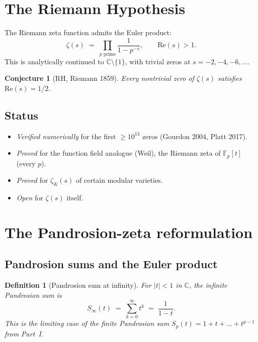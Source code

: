\documentclass[11pt,a4paper]{article}
\newtheorem{conjecture}[theorem]{Conjecture}
\newtheorem{definition}[theorem]{Definition}
\begin{document}
\tableofcontents

\section{The Riemann Hypothesis}\label{sec:setup}

The Riemann zeta function admits the Euler product:
\begin{equation}\label{eq:euler}
\zeta(s) \;=\; \prod_{p \text{ prime}} \frac{1}{1 - p^{-s}}, \qquad \mathrm{Re}(s) > 1.
\end{equation}
This is analytically continued to $\mathbb C \setminus \{1\}$, with trivial zeros at $s = -2, -4, -6, \dots$.

\begin{conjecture}[RH, Riemann 1859]\label{conj:rh}
Every nontrivial zero of $\zeta(s)$ satisfies $\mathrm{Re}(s) = 1/2$.
\end{conjecture}

\subsection{Status}
\begin{itemize}
\item \emph{Verified numerically} for the first $\ge 10^{13}$ zeros (Gourdon 2004, Platt 2017).
\item \emph{Proved} for the function field analogue (Weil), the Riemann zeta of $\mathbb F_p[t]$ (every $p$).
\item \emph{Proved} for $\zeta_K(s)$ of certain modular varieties.
\item \emph{Open} for $\zeta(s)$ itself.
\end{itemize}

\section{The Pandrosion-zeta reformulation}\label{sec:reform}

\subsection{Pandrosion sums and the Euler product}

\begin{definition}[Pandrosion sum at infinity]\label{def:S-infinity}
For $|t| < 1$ in $\mathbb C$, the \emph{infinite Pandrosion sum} is
$$
S_\infty(t) \;=\; \sum_{k=0}^{\infty} t^k \;=\; \frac{1}{1 - t}.
$$
This is the limiting case of the finite Pandrosion sum $S_p(t) = 1 + t + \dots + t^{p-1}$ from Part~I.
\end{definition}
\end{document}
